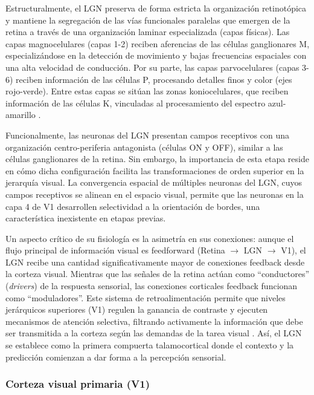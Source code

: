 Estructuralmente, el \acrshort{LGN} preserva de forma estricta la organización retinotópica y mantiene la segregación de las vías funcionales paralelas que emergen de la retina a través de una organización laminar especializada (capas físicas). Las capas magnocelulares (capas 1-2) reciben aferencias de las células ganglionares M, especializándose en la detección de movimiento y bajas frecuencias espaciales con una alta velocidad de conducción. Por su parte, las capas parvocelulares (capas 3-6) reciben información de las células P, procesando detalles finos y color (ejes rojo-verde). Entre estas capas se sitúan las zonas koniocelulares, que reciben información de las células K, vinculadas al procesamiento del espectro azul-amarillo \citep{dayan2005theoretical}.

Funcionalmente, las neuronas del \acrshort{LGN} presentan campos receptivos con una organización centro-periferia antagonista (células ON y OFF), similar a las células ganglionares de la retina. Sin embargo, la importancia de esta etapa reside en cómo dicha configuración facilita las transformaciones de orden superior en la jerarquía visual. La convergencia espacial de múltiples neuronas del \acrshort{LGN}, cuyos campos receptivos se alinean en el espacio visual, permite que las neuronas en la capa 4 de V1 desarrollen selectividad a la orientación de bordes, una característica inexistente en etapas previas.

Un aspecto crítico de su fisiología es la asimetría en sus conexiones: aunque el flujo principal de información visual es feedforward (Retina $\rightarrow$ LGN $\rightarrow$ V1), el \acrshort{LGN} recibe una cantidad significativamente mayor de conexiones feedback desde la corteza visual. Mientras que las señales de la retina actúan como ``conductores'' (\textit{drivers}) de la respuesta sensorial, las conexiones corticales feedback funcionan como ``moduladores''. Este sistema de retroalimentación permite que niveles jerárquicos superiores (V1) regulen la ganancia de contraste y ejecuten mecanismos de atención selectiva, filtrando activamente la información que debe ser transmitida a la corteza según las demandas de la tarea visual \citep{dayan2005theoretical}. Así, el \acrshort{LGN} se establece como la primera compuerta talamocortical donde el contexto y la predicción comienzan a dar forma a la percepción sensorial.

\subsubsection{Corteza visual primaria (V1)}

